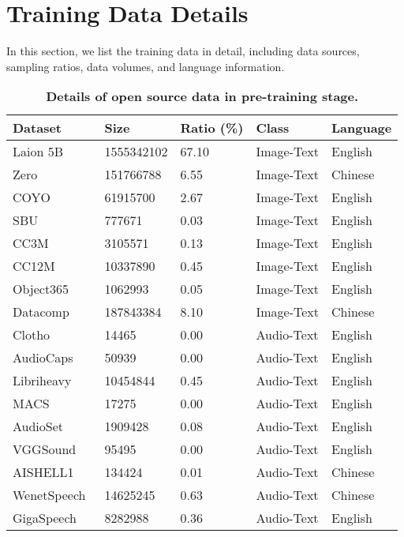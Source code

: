 \section{Training Data Details}\label{subsec:appendix_data}

In this section, we list the training data in detail, including data sources, sampling ratios, data volumes, and language information.


\begin{table}[h]
\centering
\caption{\textbf{Details of open source data in pre-training stage.}
}
\label{tab:appendix_pretrain_data}
\setlength{\tabcolsep}{7pt}
\begin{tabular}{l|l|l|l|l}
\hline
Dataset & Size & Ratio (\%) & Class & Language \\
\hline
Laion 5B~\cite{schuhmann2022laion} & 1555342102 & 67.10 & Image-Text & English \\
Zero~\cite{xiezero} & 151766788 & 6.55& Image-Text & Chinese \\
COYO~\cite{byeon2022coyo} & 61915700 &2.67& Image-Text & English \\
SBU~\cite{ordonez2011im2text} & 777671 & 0.03& Image-Text & English \\
CC3M~\cite{sharma2018conceptual} & 3105571 &0.13 & Image-Text & English \\
CC12M~\cite{changpinyo2021conceptual} & 10337890 & 0.45& Image-Text & English \\
Object365~\cite{shao2019objects365} & 1062993 & 0.05& Image-Text & English \\
Datacomp~\cite{gadre2024datacomp} & 187843384 & 8.10& Image-Text & Chinese \\
Clotho~\cite{Clotho} & 14465 & 0.00& Audio-Text & English \\
AudioCaps~\cite{AudioCaps} & 50939 &0.00 & Audio-Text & English \\
Libriheavy~\cite{Libriheavy} & 10454844 &0.45& Audio-Text & English \\
MACS~\cite{MACS} & 17275 & 0.00& Audio-Text & English \\
AudioSet~\cite{AudioSet} & 1909428 & 0.08& Audio-Text & English \\
VGGSound~\cite{VGGSound} & 95495 & 0.00& Audio-Text & English \\
AISHELL1~\cite{AISHELL1} & 134424 &0.01& Audio-Text & Chinese \\
WenetSpeech~\cite{WenetSpeech} & 14625245 & 0.63& Audio-Text & Chinese \\
GigaSpeech~\cite{GigaSpeech} & 8282988 & 0.36& Audio-Text & English \\

\end{tabular}
\end{table}

